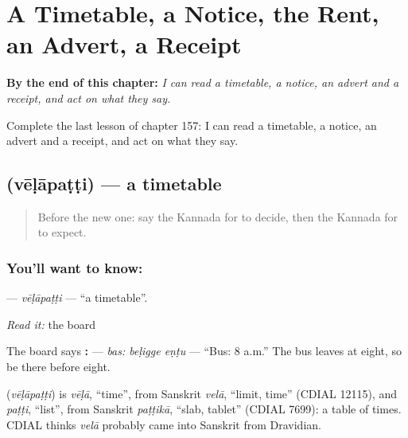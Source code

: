 
\chapter{A Timetable, a Notice, the Rent, an Advert, a Receipt}
\label{ch:ka-a-timetable-a-notice-the-rent-an-advert-a-receipt}

\begin{chapteropening}
\textbf{By the end of this chapter:} \emph{I can read a timetable, a notice, an advert and a receipt, and act on what they say.}

Complete the last lesson of chapter 157: I can read a timetable, a notice, an advert and a receipt, and act on what they say.
\end{chapteropening}

\section[\texorpdfstring{\kn{ವೇಳಾಪಟ್ಟಿ} (vēḷāpaṭṭi)}{ವೇಳಾಪಟ್ಟಿ (vēḷāpaṭṭi)}]{ (vēḷāpaṭṭi) — a timetable}

\label{lesson:KA-C157-velapatti}



\begin{quote}
Before the new one: say the Kannada for to decide, then the Kannada for to expect.
\end{quote}

\subsection*{You'll want to know: }
\textbf{} — \emph{vēḷāpaṭṭi} — \textquotedblleft{}a timetable\textquotedblright{}.

\emph{Read it:} the board

The board says \textbf{:  } — \emph{bas: beḷigge eṇṭu} — \textquotedblleft{}Bus: 8 a.m.\textquotedblright{} The bus leaves at eight, so be there before eight.

\begin{cousinweb}
\textbf{} (\emph{vēḷāpaṭṭi}) is \emph{vēḷā}, \textquotedblleft{}time\textquotedblright{}, from Sanskrit \emph{velā}, \textquotedblleft{}limit, time\textquotedblright{} (CDIAL 12115), and \emph{paṭṭi}, \textquotedblleft{}list\textquotedblright{}, from Sanskrit \emph{paṭṭikā}, \textquotedblleft{}slab, tablet\textquotedblright{} (CDIAL 7699): a table of times. CDIAL thinks \emph{velā} probably came into Sanskrit from Dravidian.
\end{cousinweb}

